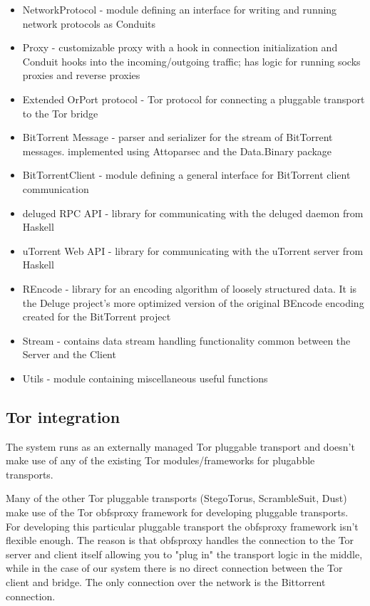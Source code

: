 \documentclass[11pt]{article} %
\begin{document}
\begin{itemize}
\item NetworkProtocol - module defining an interface for writing and running network protocols as Conduits
\item Proxy - customizable proxy with a hook in connection initialization and Conduit hooks into the incoming/outgoing traffic; has logic for running socks proxies and reverse proxies
\item Extended OrPort protocol  - Tor protocol for connecting a pluggable transport to the Tor bridge
\item BitTorrent Message  - parser and serializer for the stream of BitTorrent messages. implemented using Attoparsec and the Data.Binary package
\item BitTorrentClient - module defining a general interface for BitTorrent client communication
\item deluged RPC API - library for communicating with the deluged daemon from Haskell
\item uTorrent Web API - library for communicating with the uTorrent server from Haskell
\item REncode - library for an encoding algorithm of loosely structured data. It is the Deluge project's more optimized version of the original BEncode encoding created for the BitTorrent project 
\item Stream - contains data stream handling functionality common between the Server and the Client
\item Utils - module containing miscellaneous useful functions
\end{itemize}


\subsection{Tor integration}

The system runs as an externally managed Tor pluggable transport and doesn't make use of any of the existing Tor modules/frameworks for plugabble transports.

Many of the other Tor pluggable transports (StegoTorus, ScrambleSuit, Dust) make use of the Tor obfsproxy  framework for developing pluggable transports. For developing this particular pluggable transport the obfsproxy framework isn't flexible enough. The reason is that obfsproxy handles the connection to the Tor server and client itself allowing you to "plug in" the transport logic in the middle, while in the case of our system there is no direct connection between the Tor client and bridge. The only connection over the network is the Bittorrent connection.
\end{document}
